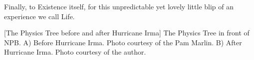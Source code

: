 Finally, to Existence itself, for this unpredictable yet lovely little blip of an experience we call Life.
\begin{multiFigure}
    \centering
        [The Physics Tree before and after Hurricane Irma]
        {The Physics Tree in front of NPB.
        \;A) Before Hurricane Irma. Photo courtesy of the Pam Marlin.
        \;B) After Hurricane Irma. Photo courtesy of the author.
        }
\end{multiFigure}
